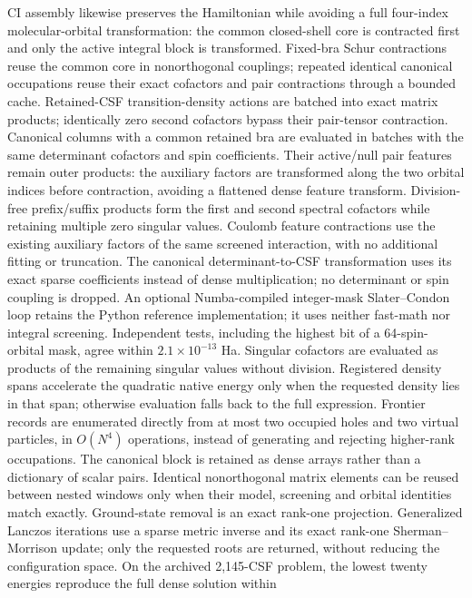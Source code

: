 \documentclass[11pt,a4paper]{article}
\begin{document}
CI assembly likewise preserves the Hamiltonian while avoiding a full
four-index molecular-orbital transformation: the common closed-shell core
is contracted first and only the active integral block is transformed.
Fixed-bra Schur contractions reuse the common core in nonorthogonal
couplings; repeated identical canonical occupations reuse their exact
cofactors and pair contractions through a bounded cache. Retained-CSF
transition-density actions are batched into exact matrix products; identically
zero second cofactors bypass their pair-tensor contraction. Canonical columns
with a common retained bra are evaluated in batches with the same determinant
cofactors and spin coefficients. Their active/null pair features remain outer
products: the auxiliary factors are transformed along the two orbital indices
before contraction, avoiding a flattened dense feature transform. Division-free prefix/suffix
products form the first and second spectral cofactors while retaining
multiple zero singular values. Coulomb
feature contractions use the existing auxiliary factors of the same
screened interaction, with no additional fitting or truncation. The canonical
determinant-to-CSF transformation uses its exact sparse coefficients
instead of dense multiplication; no determinant or spin coupling is
dropped. An optional Numba-compiled integer-mask Slater--Condon loop
retains the Python reference implementation; it uses neither fast-math
nor integral screening. Independent tests, including the highest bit of
a 64-spin-orbital mask, agree within $2.1\times10^{-13}$ Ha.
Singular cofactors are evaluated as products of the remaining
singular values without division. Registered density spans accelerate the
quadratic native energy only when the requested density lies in that span;
otherwise evaluation falls back to the full expression.
Frontier records are enumerated directly from at most two occupied holes
and two virtual particles, in $O(N^4)$ operations, instead of generating
and rejecting higher-rank occupations. The canonical block is retained
as dense arrays rather than a dictionary of scalar pairs. Identical
nonorthogonal matrix elements can be reused between nested windows only
when their model, screening and orbital identities match exactly.
Ground-state removal is an exact rank-one projection. Generalized
Lanczos iterations use a sparse metric inverse and its exact rank-one
Sherman--Morrison update; only the requested roots are returned, without
reducing the configuration space. On the archived 2,145-CSF problem,
the lowest twenty energies reproduce the full dense solution within
\end{document}
